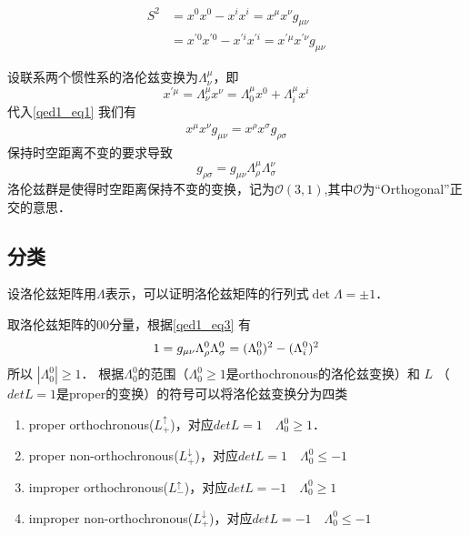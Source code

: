 \begin{equation}\label{qed1_eq1}\begin{aligned}
S^{2} &=x^{0} x^{0}-x^{i} x^{i}=x^{\mu} x^{\nu} g_{\mu \nu} \\
&=x^{\prime 0} x^{\prime 0}-x^{\prime i} x^{\prime i}=x^{\prime \mu} x^{\prime \nu} g_{\mu \nu}
\end{aligned}\end{equation}

设联系两个惯性系的洛伦兹变换为$\Lambda_{\nu}^{\mu}$，即
\begin{equation}\label{qed1_eq2}x^{\prime \mu}=\Lambda_{\nu}^{\mu} x^{\nu}=\Lambda_{0}^{\mu} x^{0}+\Lambda_{i}^{\mu} x^{i}\end{equation}
代入\autoref{qed1_eq1} 我们有
\begin{align}
x^{\mu} x^{\nu} g_{\mu \nu}=x^{\rho} x^{\sigma} g_{\rho \sigma}
\end{align}
保持时空距离不变的要求导致
\begin{equation}\label{qed1_eq3}g_{\rho \sigma}=g_{\mu \nu} \Lambda_{\rho}^{\mu} \Lambda_{\sigma}^{\nu}\end{equation}
洛伦兹群是使得时空距离保持不变的变换，记为$\mathcal{O}(3,1)$,其中$\mathcal{O}$为“Orthogonal”正交的意思．
\subsection{分类}
设洛伦兹矩阵用$\Lambda$表示，可以证明洛伦兹矩阵的行列式$\det \Lambda=\pm1$．

取洛伦兹矩阵的00分量，根据\autoref{qed1_eq3} 有
\begin{equation}
1=g_{\mu \nu} \Lambda_{\rho}^{0} \Lambda_{\sigma}^{0}= (\Lambda_{0}^{0})^2- (\Lambda_{i}^{0})^2\\
\end{equation}
所以 $\left|\Lambda_{0}^{0} \right|\geqslant1$． 根据$\Lambda_{0}^{0}$的范围（$\Lambda_{0}^{0}\geqslant1$是orthochronous的洛伦兹变换）和 $L$ （$detL=1$是proper的变换）的符号可以将洛伦兹变换分为四类
\begin{enumerate}
\item proper orthochronous($L_{+}^{\uparrow}$)，对应$detL=1\quad \Lambda_{0}^{0}\geqslant1$．
\item proper non-orthochronous($L_{+}^{\downarrow}$)，对应$detL=1\quad \Lambda_{0}^{0}\leqslant-1$
\item improper orthochronous($L_{-}^{\uparrow}$)，对应$detL=-1 \quad\Lambda_{0}^{0}\geqslant1$
\item improper non-orthochronous($L_{+}^{\downarrow}$)，对应$detL=-1 \quad\Lambda_{0}^{0}\leqslant-1$
\end{enumerate}

